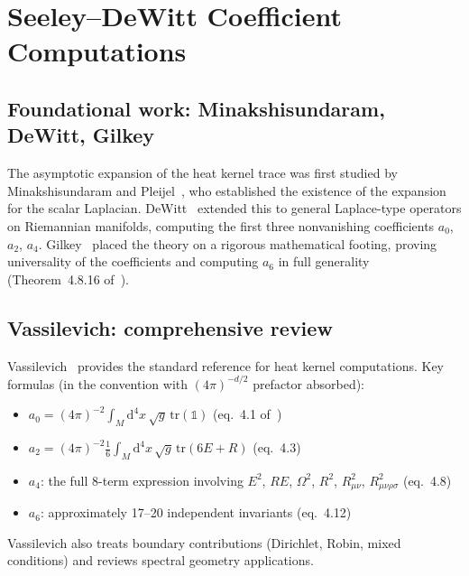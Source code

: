 \documentclass[11pt,a4paper]{article}
\newcommand{\Id}{\mathbb{1}}
\renewcommand{\dd}{\mathrm{d}}
\begin{document}
\section{Seeley--DeWitt Coefficient Computations}\label{sec:sdw-coeff}

\subsection{Foundational work: Minakshisundaram, DeWitt, Gilkey}

The asymptotic expansion of the heat kernel trace was first studied by
Minakshisundaram and Pleijel~\cite{MP49}, who established the existence
of the expansion for the scalar Laplacian.  DeWitt~\cite{DeW65} extended
this to general Laplace-type operators on Riemannian manifolds, computing
the first three nonvanishing coefficients $a_0$, $a_2$, $a_4$.
Gilkey~\cite{G75,G95} placed the theory on a rigorous mathematical
footing, proving universality of the coefficients and computing $a_6$
in full generality (Theorem~4.8.16 of~\cite{G95}).

\subsection{Vassilevich: comprehensive review}

Vassilevich~\cite{V03} provides the standard reference for heat kernel
computations.  Key formulas (in the convention with $(4\pi)^{-d/2}$
prefactor absorbed):

\begin{itemize}
  \item $a_0 = (4\pi)^{-2}\int_M\dd^4x\,\sqrt{g}\,\mathrm{tr}(\Id)$
    \quad (eq.~4.1 of~\cite{V03})
  \item $a_2 = (4\pi)^{-2}\frac{1}{6}\int_M\dd^4x\,\sqrt{g}\,
    \mathrm{tr}(6E + R)$ \quad (eq.~4.3)
  \item $a_4$: the full 8-term expression involving $E^2$, $RE$,
    $\Omega^2$, $R^2$, $R_{\mu\nu}^2$, $R_{\mu\nu\rho\sigma}^2$
    (eq.~4.8)
  \item $a_6$: approximately 17--20 independent invariants (eq.~4.12)
\end{itemize}

Vassilevich also treats boundary contributions (Dirichlet, Robin,
mixed conditions) and reviews spectral geometry applications.
\end{document}
